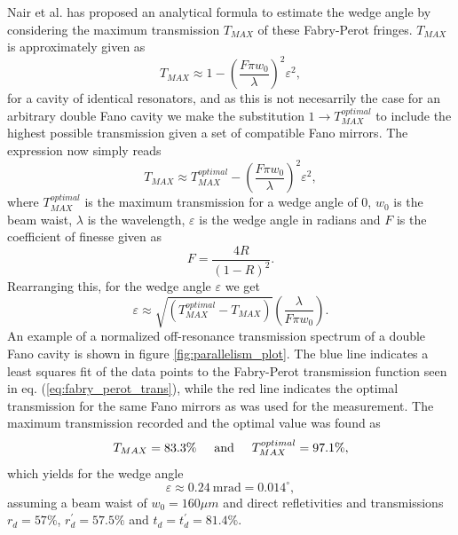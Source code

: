Nair et al. \cite{Nair} has proposed an analytical formula to estimate the wedge angle by considering the maximum transmission $T_{MAX}$ of these Fabry-Perot fringes. $T_{MAX}$ is approximately given as 
\begin{equation}
    T_{MAX} \approx 1 - \left(\frac{F \pi w_0}{\lambda}\right)^2 \varepsilon^2,
\end{equation}
for a cavity of identical resonators, and as this is not necesarrily the case for an arbitrary double Fano cavity we make the substitution $1 \rightarrow T_{MAX}^{optimal}$ to include the highest possible transmission given a set of compatible Fano mirrors. The expression now simply reads
\begin{equation}
    T_{MAX} \approx T_{MAX}^{optimal} - \left(\frac{F \pi w_0}{\lambda}\right)^2 \varepsilon^2,
\end{equation}
where $T_{MAX}^{optimal}$ is the maximum transmission for a wedge angle of $0$, $w_0$ is the beam waist, $\lambda$ is the wavelength, $\varepsilon$ is the wedge angle in radians and $F$ is the coefficient of finesse \cite{Pedrotti} given as
\begin{equation}
    F = \frac{4R}{(1-R)^2}.
\end{equation}
Rearranging this, for the wedge angle $\varepsilon$ we get
\begin{equation}
    \varepsilon \approx \sqrt{\left(T_{MAX}^{optimal} - T_{MAX} \right)} \left(\frac{\lambda}{F \pi w_0}\right).
\end{equation}
An example of a normalized off-resonance transmission spectrum of a double Fano cavity is shown in figure \ref{fig:parallelism_plot}. The blue line indicates a least squares fit of the data points to the Fabry-Perot transmission function seen in eq. (\ref{eq:fabry_perot_trans}), while the red line indicates the optimal transmission for the same Fano mirrors as was used for the measurement. The maximum transmission recorded and the optimal value was found as
\begin{equation}
    T_{MAX} = 83.3\% \hspace{0.5cm} \text{and} \hspace{0.5cm} T_{MAX}^{optimal} = 97.1\%,
\end{equation}
which yields for the wedge angle 
\begin{equation}
    \varepsilon \approx 0.24 \: \text{mrad} = 0.014^{\circ},
\end{equation}
assuming a beam waist of $w_0 = 160 \mu m$ and direct refletivities and transmissions $r_d = 57\%$, $r_d^{\prime} = 57.5\%$ and $t_d = t_d^{\prime} = 81.4\%$.

